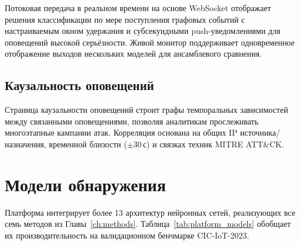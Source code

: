 Потоковая передача в реальном времени на основе WebSocket отображает решения классификации по мере поступления графовых событий с настраиваемым окном удержания и субсекундными push-уведомлениями для оповещений высокой серьёзности. Живой монитор поддерживает одновременное отображение выходов нескольких моделей для ансамблевого сравнения.

\subsection{Каузальность оповещений}

Страница каузальности оповещений строит графы темпоральных зависимостей между связанными оповещениями, позволяя аналитикам прослеживать многоэтапные кампании атак. Корреляция основана на общих IP источника/назначения, временной близости ($\pm$30\,с) и связках техник MITRE ATT\&CK.


\section{Модели обнаружения}
\label{sec:platform_models}

Платформа интегрирует более 13 архитектур нейронных сетей, реализующих все семь методов из Главы~\ref{ch:methods}. Таблица~\ref{tab:platform_models} обобщает их производительность на валидационном бенчмарке CIC-IoT-2023.

